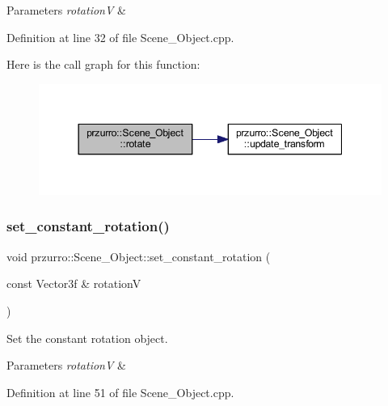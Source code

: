 \begin{DoxyParams}{Parameters}
{\em rotationV} & \\
\hline
\end{DoxyParams}


Definition at line 32 of file Scene\+\_\+\+Object.\+cpp.

Here is the call graph for this function\+:
\nopagebreak
\begin{figure}[H]
\begin{center}
\leavevmode
\includegraphics[width=344pt]{d9/d84/classprzurro_1_1_scene___object_a417701b484844d3eaeba812c90a2821d_cgraph}
\end{center}
\end{figure}
\mbox{\label{classprzurro_1_1_scene___object_acbc820f987203bc0d635b4e1d0d3b3ac}} 
\subsubsection{\texorpdfstring{set\_constant\_rotation()}{set\_constant\_rotation()}}
{\footnotesize\ttfamily void przurro\+::\+Scene\+\_\+\+Object\+::set\+\_\+constant\+\_\+rotation (\begin{DoxyParamCaption}\item[{const Vector3f \&}]{rotationV }\end{DoxyParamCaption})}



Set the constant rotation object. 


\begin{DoxyParams}{Parameters}
{\em rotationV} & \\
\hline
\end{DoxyParams}


Definition at line 51 of file Scene\+\_\+\+Object.\+cpp.

